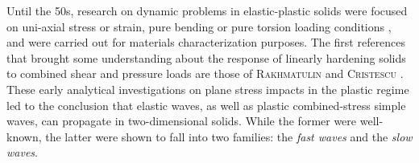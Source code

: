 Until the 50s, research on dynamic problems in elastic-plastic solids were focused on uni-axial stress or strain, pure bending or pure torsion loading conditions \cite{Taylor,vonKarman}, and were carried out for materials characterization purposes.
The first references that brought some understanding about the response of linearly hardening solids to combined shear and pressure loads are those of \textsc{Rakhmatulin} \cite{Rakhmatulin} and \textsc{Cristescu} \cite{CRISTESCU19591605}.
These early analytical investigations on plane stress impacts in the plastic regime led to the conclusion that elastic waves, as well as plastic combined-stress simple waves, can propagate in two-dimensional solids. 
While the former were well-known, the latter were shown to fall into two families: the \textit{fast waves} and the \textit{slow waves}.

